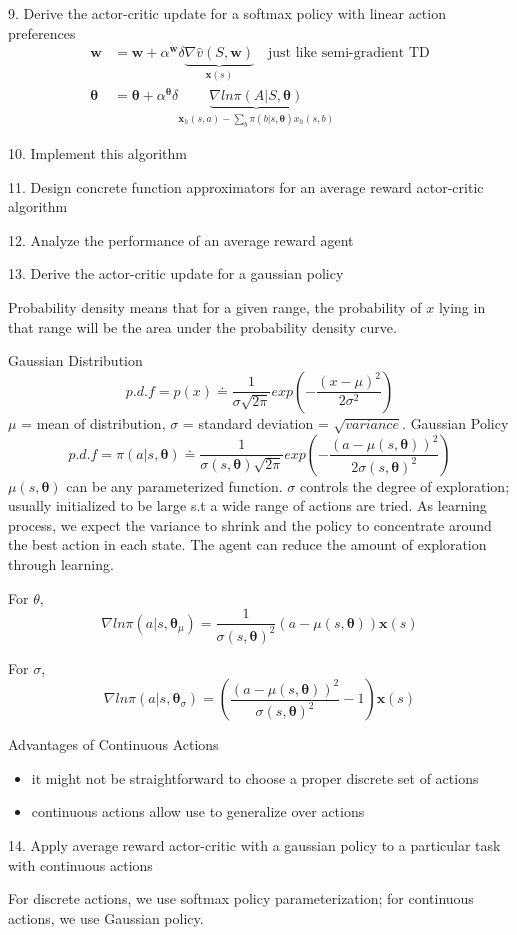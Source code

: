 \documentclass[sutton_barto_notes.tex]{subfiles}
\begin{document}
9. Derive the actor-critic update for a softmax policy with linear action preferences 
\begin{align*}
\bm{w} &= \bm{w} + \alpha^{\bm{w}} \delta \underbrace{\nabla\hat{v}(S,\bm{w})}_{\bm{x}(s)} \quad \text{just like semi-gradient TD}\\
\bm{\theta} &= \bm{\theta} + \alpha^{\bm{\theta}}\delta \underbrace{\nabla ln \pi(A|S,\bm{\theta})}_{ \bm{x}_h(s,a) - \sum_b \pi(b|s, \bm{\theta})x_h(s,b) }
\end{align*}

10. Implement this algorithm 

11. Design concrete function approximators for an average reward actor-critic algorithm 

12. Analyze the performance of an average reward agent 

13. Derive the actor-critic update for a gaussian policy 

Probability density means that for a given range, the probability of $x$ lying in that range will be the area under the probability density curve.

Gaussian Distribution
$$ p.d.f = p(x) \doteq \frac{1}{\sigma \sqrt{2\pi}}exp( -\frac{(x-\mu)^2}{2\sigma^2} )$$
$\mu$ = mean of distribution, $\sigma$ = standard deviation = $\sqrt{variance}$.
Gaussian Policy
$$ p.d.f = \pi(a|s,\bm{\theta}) \doteq \frac{1}{\sigma(s,\bm{\theta}) \sqrt{2\pi}}exp( -\frac{(a-\mu(s,\bm{\theta}))^2}{2\sigma(s,\bm{\theta})^2} )$$
$\mu(s,\bm{\theta})$ can be any parameterized function.
$\sigma$ controls the degree of exploration; usually initialized to be large s.t a wide range of actions are tried. As learning process, we expect the variance to shrink and the policy to concentrate around the best action in each state. The agent can reduce the amount of exploration through learning.

For $\theta$,
$$\nabla ln\pi(a|s, \bm{\theta}_\mu) = \frac{1}{\sigma(s,\bm{\theta})^2}(a-\mu(s,\bm{\theta}))\bm{x}(s)$$

For $\sigma$,
$$\nabla ln\pi(a|s, \bm{\theta}_\sigma) = (\frac{( a- \mu(s,\bm{\theta}) )^2}{\sigma(s,\bm{\theta})^2} - 1) \bm{x}(s)$$

Advantages of Continuous Actions
\begin{itemize}
\item it might not be straightforward to choose a proper discrete set of actions
\item continuous actions allow use to generalize over actions
\end{itemize}


14. Apply average reward actor-critic with a gaussian policy to a particular task with continuous actions

For discrete actions, we use softmax policy parameterization; for continuous actions, we use Gaussian policy.
\end{document}
